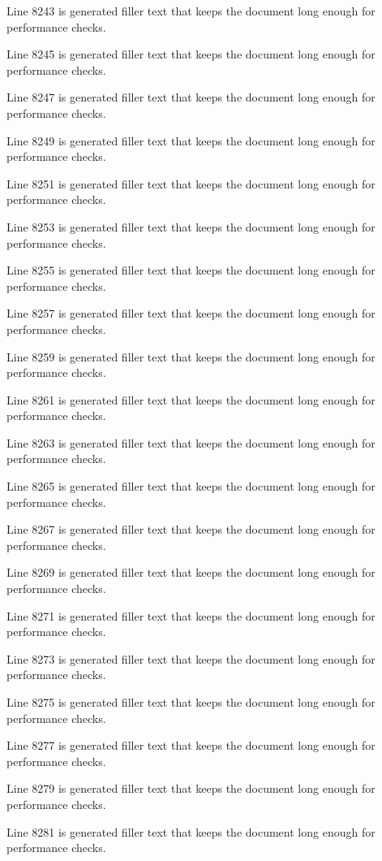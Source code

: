 Line 8243 is generated filler text that keeps the document long enough for performance checks.

Line 8245 is generated filler text that keeps the document long enough for performance checks.

Line 8247 is generated filler text that keeps the document long enough for performance checks.

Line 8249 is generated filler text that keeps the document long enough for performance checks.

Line 8251 is generated filler text that keeps the document long enough for performance checks.

Line 8253 is generated filler text that keeps the document long enough for performance checks.

Line 8255 is generated filler text that keeps the document long enough for performance checks.

Line 8257 is generated filler text that keeps the document long enough for performance checks.

Line 8259 is generated filler text that keeps the document long enough for performance checks.

Line 8261 is generated filler text that keeps the document long enough for performance checks.

Line 8263 is generated filler text that keeps the document long enough for performance checks.

Line 8265 is generated filler text that keeps the document long enough for performance checks.

Line 8267 is generated filler text that keeps the document long enough for performance checks.

Line 8269 is generated filler text that keeps the document long enough for performance checks.

Line 8271 is generated filler text that keeps the document long enough for performance checks.

Line 8273 is generated filler text that keeps the document long enough for performance checks.

Line 8275 is generated filler text that keeps the document long enough for performance checks.

Line 8277 is generated filler text that keeps the document long enough for performance checks.

Line 8279 is generated filler text that keeps the document long enough for performance checks.

Line 8281 is generated filler text that keeps the document long enough for performance checks.

